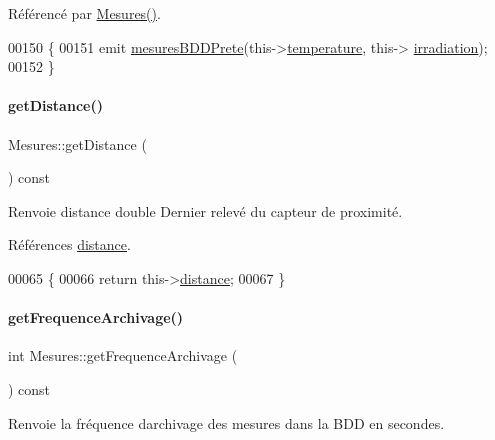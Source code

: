 Référencé par \hyperlink{class_mesures_aa24ed1e055242fab5adab3f8f057c9b1}{Mesures()}.


\begin{DoxyCode}
00150 \{
00151     emit \hyperlink{class_mesures_a97d8dbd7742519d1f3ce959661d8aede}{mesuresBDDPrete}(this->\hyperlink{class_mesures_a2688d0da4acf9d91ea0befd6ed0bd140}{temperature}, this->
      \hyperlink{class_mesures_a77cde7672dac5e544b7288364ec7c7b5}{irradiation});
00152 \}
\end{DoxyCode}
\mbox{\label{class_mesures_aa40d78428855bab861cc9a57582c8d42}} 
\paragraph{\texorpdfstring{get\+Distance()}{getDistance()}}
{\footnotesize\ttfamily Mesures\+::get\+Distance (\begin{DoxyParamCaption}{ }\end{DoxyParamCaption}) const}

\begin{DoxyReturn}{Renvoie}
distance double Dernier relevé du capteur de proximité. 
\end{DoxyReturn}


Références \hyperlink{class_mesures_a276f71168b1dcecf2051631d19aa8eeb}{distance}.


\begin{DoxyCode}
00065 \{
00066     \textcolor{keywordflow}{return} this->\hyperlink{class_mesures_a276f71168b1dcecf2051631d19aa8eeb}{distance};
00067 \}
\end{DoxyCode}
\mbox{\label{class_mesures_ae969e38402b8d19fe9b484f368200578}} 
\paragraph{\texorpdfstring{get\+Frequence\+Archivage()}{getFrequenceArchivage()}}
{\footnotesize\ttfamily int Mesures\+::get\+Frequence\+Archivage (\begin{DoxyParamCaption}{ }\end{DoxyParamCaption}) const}

Renvoie la fréquence d\textquotesingle{}archivage des mesures dans la B\+DD en secondes.

